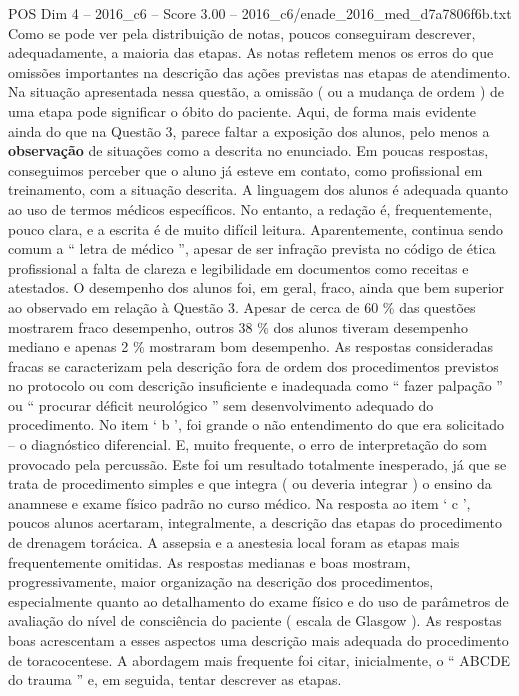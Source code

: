 \begin{textsample}{POS Dim 4 – 2016\_c6 – Score 3.00 – 2016\_c6/enade\_2016\_med\_d7a7806f6b.txt}
Como se pode ver pela distribuição de notas, poucos conseguiram descrever, adequadamente, a maioria das etapas.
As notas refletem menos os erros do que omissões importantes na descrição das ações previstas nas etapas de atendimento.
Na situação apresentada nessa questão, a omissão ( ou a mudança de ordem ) de uma etapa pode significar o óbito do paciente.
Aqui, de forma mais evidente ainda do que na Questão 3, parece faltar a exposição dos alunos, pelo menos a \textbf{observação} de situações como a descrita no enunciado.
Em poucas respostas, conseguimos perceber que o aluno já esteve em contato, como profissional em treinamento, com a situação descrita.
A linguagem dos alunos é adequada quanto ao uso de termos médicos específicos.
No entanto, a redação é, frequentemente, pouco clara, e a escrita é de muito difícil leitura.
Aparentemente, continua sendo comum a “ letra de médico ”, apesar de ser infração prevista no código de ética profissional a falta de clareza e legibilidade em documentos como receitas e atestados.
O desempenho dos alunos foi, em geral, fraco, ainda que bem superior ao observado em relação à Questão 3.
Apesar de cerca de 60 \% das questões mostrarem fraco desempenho, outros 38 \% dos alunos tiveram desempenho mediano e apenas 2 \% mostraram bom desempenho.
As respostas consideradas fracas se caracterizam pela descrição fora de ordem dos procedimentos previstos no protocolo ou com descrição insuficiente e inadequada como “ fazer palpação ” ou “ procurar déficit neurológico ” sem desenvolvimento adequado do procedimento.
No item ‘ b ’, foi grande o não entendimento do que era solicitado – o diagnóstico diferencial.
E, muito frequente, o erro de interpretação do som provocado pela percussão.
Este foi um resultado totalmente inesperado, já que se trata de procedimento simples e que integra ( ou deveria integrar ) o ensino da anamnese e exame físico padrão no curso médico.
Na resposta ao item ‘ c ’, poucos alunos acertaram, integralmente, a descrição das etapas do procedimento de drenagem torácica.
A assepsia e a anestesia local foram as etapas mais frequentemente omitidas.
As respostas medianas e boas mostram, progressivamente, maior organização na descrição dos procedimentos, especialmente quanto ao detalhamento do exame físico e do uso de parâmetros de avaliação do nível de consciência do paciente ( escala de Glasgow ).
As respostas boas acrescentam a esses aspectos uma descrição mais adequada do procedimento de toracocentese.
A abordagem mais frequente foi citar, inicialmente, o “ ABCDE do trauma ” e, em seguida, tentar descrever as etapas.

\end{textsample}
